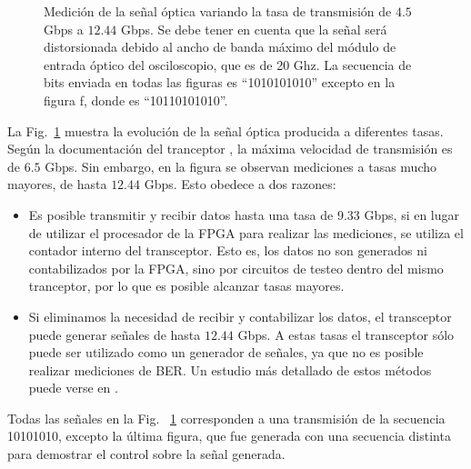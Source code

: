 \begin{figure}[!t]
   \qquad
  \caption {Medición de la señal óptica variando la tasa de transmisión de $4.5$ Gbps a $12.44$ Gbps. Se debe tener en cuenta que la señal será distorsionada debido al ancho de banda máximo del módulo de entrada óptico del osciloscopio, que es de 20 Ghz. La secuencia de bits enviada en todas las figuras es ``1010101010'' excepto en la figura f, donde es ``10110101010''.}
  \label{fig:ImgTasa}
\end{figure}





La Fig.~\ref{fig:ImgTasa} muestra la evolución de la señal óptica producida a diferentes
tasas. Según la documentación del tranceptor \cite{ug198}, la máxima velocidad de transmisión es de $6.5$ Gbps. Sin embargo, en la figura se observan mediciones a tasas mucho mayores, de hasta $12.44$ Gbps. Esto obedece a dos razones:
\begin{itemize}
 \item Es posible transmitir y recibir datos hasta una tasa de 9.33 Gbps, si en lugar de utilizar el procesador de la FPGA para realizar las mediciones, se utiliza el contador interno del transceptor. Esto es, los datos no son generados ni contabilizados por la FPGA, sino por circuitos de testeo dentro del mismo tranceptor, por lo que es posible alcanzar tasas mayores.
 \item Si eliminamos la necesidad de recibir y contabilizar los datos, el transceptor puede generar señales de hasta $12.44$ Gbps. A estas tasas el transceptor sólo puede ser utilizado como un generador de señales, ya que no es posible realizar mediciones de BER. Un estudio más detallado de estos métodos puede verse en \cite{OBGAH2010}.
\end{itemize}


Todas las señales en la Fig. ~\ref{fig:ImgTasa} corresponden a una transmisión de la secuencia 10101010, excepto la última figura,
que fue generada con una secuencia distinta para demostrar el control sobre la señal generada.

